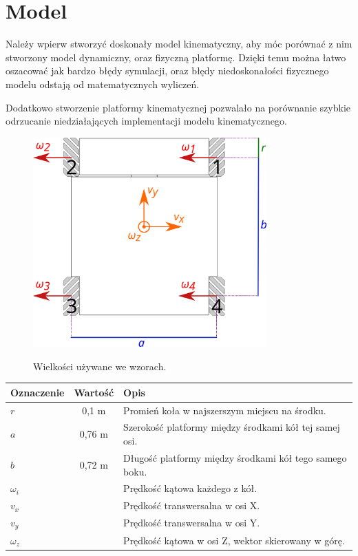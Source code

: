 \chapter{Model}
Należy wpierw stworzyć doskonały model kinematyczny, aby móc porównać z nim stworzony model dynamiczny, oraz fizyczną platformę.
Dzięki temu można łatwo oszacować jak bardzo błędy symulacji, oraz błędy niedoskonałości fizycznego modelu odstają od matematycznych wyliczeń.

Dodatkowo stworzenie platformy kinematycznej pozwalało na porównanie szybkie odrzucanie niedziałających implementacji modelu kinematycznego.
\begin{figure}[H]
\centering
 \includegraphics[width=0.8\textwidth]{graphics/base_dims.pdf}
 \label{graphics:base_dims}
\caption{Wielkości używane we wzorach.}
\end{figure} 
\begin{tabular}{l c l}
Oznaczenie & Wartość & Opis \\
\hline
$r$ & 0,1 m & Promień koła w najszerszym miejscu na środku. \\
$a$ & 0,76 m & Szerokość platformy między środkami kół tej samej osi. \\
$b$ & 0,72 m & Długość platformy między środkami kół tego samego boku. \\
$\omega_i$ & & Prędkość kątowa każdego z kół. \\
$v_x$ & & Prędkość transwersalna w osi X. \\
$v_y$ & & Prędkość transwersalna w osi Y. \\
$\omega_z$ & & Prędkość kątowa w osi Z, wektor skierowany w górę. \\
\end{tabular}

